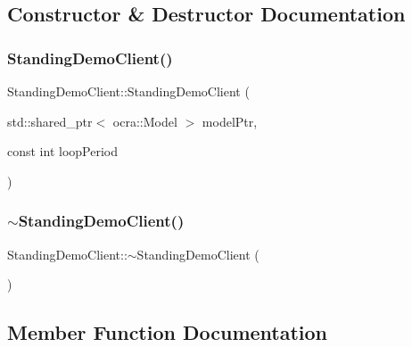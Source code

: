 \subsection{Constructor \& Destructor Documentation}
\hypertarget{classStandingDemoClient_a7fc81439cf274825e81f243fab4ee94a}{}\label{classStandingDemoClient_a7fc81439cf274825e81f243fab4ee94a} 
\subsubsection{\texorpdfstring{Standing\+Demo\+Client()}{StandingDemoClient()}}
{\footnotesize\ttfamily Standing\+Demo\+Client\+::\+Standing\+Demo\+Client (\begin{DoxyParamCaption}\item[{std\+::shared\+\_\+ptr$<$ ocra\+::\+Model $>$}]{model\+Ptr,  }\item[{const int}]{loop\+Period }\end{DoxyParamCaption})}

\hypertarget{classStandingDemoClient_a36afdcb86f9e304c53f9903d6b286dd7}{}\label{classStandingDemoClient_a36afdcb86f9e304c53f9903d6b286dd7} 
\subsubsection{\texorpdfstring{$\sim$\+Standing\+Demo\+Client()}{~StandingDemoClient()}}
{\footnotesize\ttfamily Standing\+Demo\+Client\+::$\sim$\+Standing\+Demo\+Client (\begin{DoxyParamCaption}{ }\end{DoxyParamCaption})\hspace{0.3cm}{\ttfamily [virtual]}}



\subsection{Member Function Documentation}
\hypertarget{classStandingDemoClient_a9cca697399c183d9e2e5fe5b45dbc815}{}\label{classStandingDemoClient_a9cca697399c183d9e2e5fe5b45dbc815} 

